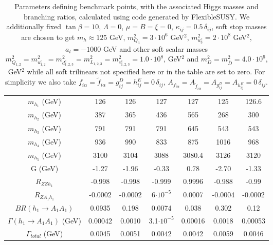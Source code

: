 \documentclass[12pt,a4paper]{article}
\begin{document}
\begin{table}
\begin{tabular}{| c || c | c |c| c| c| c |}
$m_{h_1}$ (GeV)                    &	126                & 	126         & 	127                & 127             & 	125               & 	126.6   \\
$m_{h_2}$ (GeV)                    &	387                 & 	365          & 	436                & 565             & 	268               & 	300    \\  
$m_{h_3}$ (GeV)                    &	791               & 	791         & 	791                & 645             & 	543               & 	543    \\ 
$m_{h_4}$ (GeV)                    &	936                & 	990         & 	833                & 875             & 	1016              & 	968     \\ 
$m_{h_5}$ (GeV)                    &	3100                 & 	3104         & 	3088               & 3080.4          & 	3126              & 	3120   \\
\hline 
G (GeV)                        &       -1.27               & 	-1.96        & 	-0.33              & 0.78            & 	-2.70            & 	-1.33  \\ 
$R_{ZZh_1}$                      &     -0.998             &       -0.998       &  -0.999             & 0.9996          & -0.988            & 	-0.99  \\   
$R_{ZA_1h_1}$                       &  -0.0002            &      -0.0002        &  6$\cdot 10^{-5}$              & 0.0007          & -0.0004           & 	-0.0002 \\
$BR(h_1\rightarrow A_1A_1)$       &    0.0935            &       0.198        &  0.0074             & 0.038           &  0.302            & 	0.12    \\
$\Gamma(h_1\rightarrow A_1A_1)$ (GeV) &	0.00042           & 	0.0010       & 	3.1$\cdot 10^{-5}$           & 0.00016         & 0.0018             & 	0.00053 \\ 
$\Gamma_{total}$ (GeV)           &     0.0045         	&   	0.0051 	     & 	0.0042              & 0.0042         & 0.0059              & 	0.0046  \\                                                                       
\hline                                                                                                 
\end{tabular}
\caption{Parameters defining benchmark points, with the associated Higgs masses and branching ratios, calculated using code generated by FlexibleSUSY. We additionally fixed $\tan\beta = 10$, $\Lambda = 0$, $\mu = B = \xi = 0$, $\kappa_{ij} = 0.5 \, \delta_{ij}$,   soft stop masses are chosen to get $m_h \approx 125$ GeV,  $m_{Q_{3}}^2 = 3\cdot 10^6$ GeV$^2$,  $m_{u^c_{3}}^2 = 2\cdot 10^8$ GeV$^2$, $a_t = -1000$  GeV and other soft scalar masses  $m_{Q_{1,2}}^2 = m_{u^c_{1,2}}^2 = m_{d^c_{1,2,3}}^2 = m_{L_{1,2, 3}}^2 = m_{e^c_{1,2,3}}^2 = 1.0 \cdot 10^8$, GeV$^2$ and  $m_{D}^2 =  m_{\overline{D}}^2 = 4.0 \cdot 10^6$,  GeV$^2$ while all soft trilinears not specified here or in the table are set to zero. For simplicity we also take $f_{i\alpha} = \tilde{f}_{i\alpha} = g^D_{ij} = h^E_{ij} =0 \, \delta_{ij}$,  $A_{f_{i\alpha}} = A_{\tilde{f}_{i\alpha}} = A_{g^D_{ij}} = A_{h^E_{ij}} =0 \, \delta_{ij}$.}

\end{table}
\end{document}
